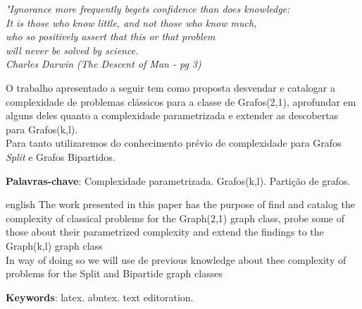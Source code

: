 \documentclass[
	12pt,				%
	openright,			%
	oneside,			%
	a4paper,			%
	english,			%
	french,				%
	spanish,			%
	brazil				%
	]{abntex2}
\begin{document}
\begin{agradecimentos}


\end{agradecimentos}

\begin{epigrafe}
    \vspace*{\fill}
	\begin{flushright}
		\textit{"Ignorance more frequently begets confidence than does knowledge:\\
		It is those who know little, and not those who know much,\\ who so positively assert that this or that problem\\ will never be solved by science.\\
		Charles Darwin (The Descent of Man - pg 3)}
	\end{flushright}
\end{epigrafe}


\setlength{\absparsep}{18pt} %
\begin{resumo}
 O trabalho apresentado a seguir tem como proposta desvendar e catalogar a complexidade
 de problemas clássicos para a classe de Grafos(2,1), aprofundar em alguns deles quanto
 a complexidade parametrizada e extender as descobertas para Grafos(k,l).\\
 Para tanto utilizaremos do conhecimento prévio de complexidade para Grafos \textit{Split}
 e Grafos Bipartidos.
 
 \vspace{\onelineskip}
 
 \textbf{Palavras-chave}: Complexidade parametrizada. Grafos(k,l). Partição de grafos.
\end{resumo}

\begin{resumo}[Abstract]
 \begin{otherlanguage*}{english}
   The work presented in this paper has the purpose of find and catalog the complexity
   of classical problems for the Graph(2,1) graph class, probe some of those about their 
   parametrized complexity and extend the findings to the Graph(k,l) graph class\\
   In way of doing so we will use de previous knowledge about thee complexity of problems for the
   Split and Bipartide graph classes

   \vspace{\onelineskip}
 
   \noindent 
   \textbf{Keywords}: latex. abntex. text editoration.
 \end{otherlanguage*}
\end{resumo}
\end{document}

